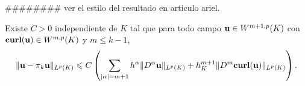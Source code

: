 {\color{blue}\#\#\#\#\#\#\#\# ver el estilo del resultado en
articulo ariel.}
\begin{theorem}
Existe $C > 0$ independiente de $K$ tal que para todo campo ${\bf u}\in W^{m + 1,p}(K)$ con 
${\bf curl}({\bf u})\in W^{m,p}(K)$ y $m\leqslant k-1$, 
\[
  \|{\bf u}-\pi_k {\bf u}\|_{L^p(K)} \leqslant C \left(
  \sum_{|\alpha|=m+1}h^\alpha \|D^\alpha{\bf u}\|_{L^p(K)} +
  h_K^{m+1}\|D^m{\bf{curl}}({\bf u})\|_{L^p(K)} \right).
\]
\end{theorem}


